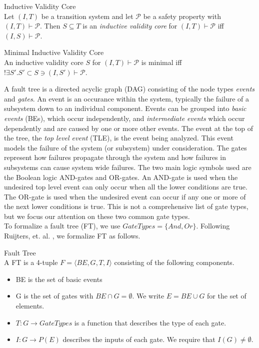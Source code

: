 \begin{definition}Inductive Validity Core\\
 Let $(I,T)$ be a transition system and let $\mathcal{P}$ be a safety property with $(I,T) \vdash \mathcal{P}$. Then $S \subseteq T$ is an \textit{inductive validity core} for $(I,T) \vdash \mathcal{P}$ iff $(I,S) \vdash\mathcal{P}$.  \\
\end{definition}

\begin{definition}Minimal Inductive Validity Core\\
An inductive validity core $S$ for $(I,T) \vdash \mathcal{P}$ is minimal iff $! \exists S' . S' \subset S \ni (I,S') \vdash \mathcal{P}$. \\
\end{definition}

A fault tree is a directed acyclic graph (DAG) consisting of the node types \textit{events} and \textit{gates}. An event is an occurance within the system, typically the failure of a subsystem down to an individual component. Events can be grouped into \textit{basic events} (BEs), which occur independently, and \textit{intermediate events} which occur dependently and are caused by one or more other events. The event at the top of the tree, the \textit{top level event} (TLE), is the event being analyzed. This event models the failure of the system (or subsystem) under consideration. The gates represent how failures propagate through the system and how failures in subsystems can cause system wide failures. The two main logic symbols used are the Boolean logic AND-gates and OR-gates.
An AND-gate is used when the undesired top level event can only occur when all the lower conditions are true. The OR-gate is used when the undesired event can occur if any one or more of the next lower conditions is true. This is not a comprehensive list of gate types, but we focus our attention on these two common gate types.\\

To formalize a fault tree (FT), we use $GateTypes = \{And, Or\}$. Following Ruijters, et. al. \cite{RuijtersSurvey}, we formalize FT as follows. \\

\begin{definition}Fault Tree\\ 
A FT is a 4-tuple $F = \langle BE, G, T, I \rangle$ consisting of the following components. 
\begin{itemize}
\item BE is the set of basic events
\item G is the set of gates with $BE \cap G = \emptyset$. We write $E = BE \cup G$ for the set of elements.
\item $T: G \to GateTypes$ is a function that describes the type of each gate.
\item $I: G \to P(E)$ describes the inputs of each gate. We require that $I(G) \neq \emptyset$.
\end{itemize}
\end{definition}

